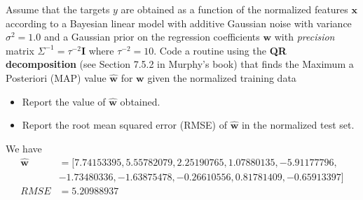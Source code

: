 \documentclass[submit]{harvardml}
\begin{document}
\begin{problem}[7pts]\label{prob:analytic_linear_model}
Assume that the targets $y$ are obtained as a function of the normalized
features $\mathbf{x}$ according to a Bayesian linear model with additive Gaussian noise with variance
$\sigma^2 = 1.0$ and a Gaussian prior on the regression coefficients $\mathbf{w}$
with \textit{precision} matrix $\Sigma^{-1} = \tau^{-2}\mathbf{I}$ where $\tau^{-2} = 10$. Code a routine
using the \textbf{QR decomposition} (see Section 7.5.2 in Murphy's book) that finds the Maximum a
Posteriori (MAP) value $\hat{\mathbf{w}}$ for $\mathbf{w}$ given the normalized
training data
\begin{itemize}
\item Report the value of $\hat{\mathbf{w}}$ obtained.
\item Report the root mean squared error (RMSE) of $\hat{\mathbf{w}}$ in the normalized test set.
\end{itemize}
\vspace{0.1cm}
\end{problem}
We have
\begin{align*}
\hat{\mathbf{w}} 
&= [ 7.74153395,  5.55782079,  2.25190765,  1.07880135, -5.91177796, \\ & -1.73480336, -1.63875478, -0.26610556,  0.81781409, -0.65913397] \\
RMSE &= 5.20988937
\end{align*}
\end{document}
